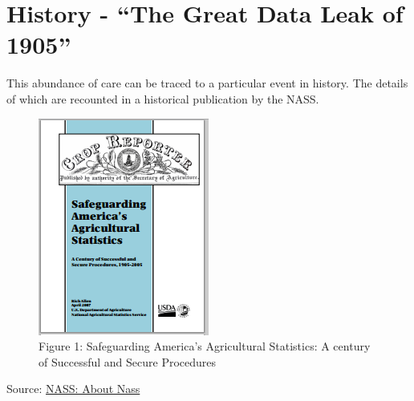 \documentclass[
  letterpaper,
  DIV=11,
  numbers=noendperiod]{scrreprt}
\begin{document}
\hypertarget{history---the-great-data-leak-of-1905}{%
\section{History - ``The Great Data Leak of
1905''}\label{history---the-great-data-leak-of-1905}}

This abundance of care can be traced to a particular event in history.
The details of which are recounted in a historical publication by the
NASS.

\begin{figure}

{\centering \includegraphics{images/NASS_History.png}

}

\caption{Figure 1: Safeguarding America's Agricultural Statistics: A
century of Successful and Secure Procedures}

\end{figure}

Source:
\href{pdf-Readings/safegaurding-americas-agricultural-statistics.pdf}{NASS:
About Nass}
\end{document}
